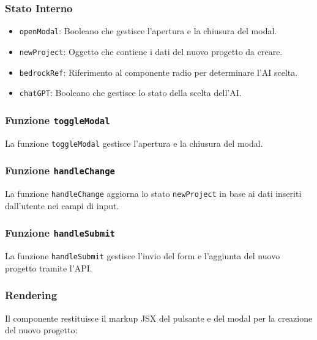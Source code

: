 \documentclass{article}
\begin{document}
\subsubsection*{Stato Interno}
\begin{itemize}
    \item \texttt{openModal}: Booleano che gestisce l'apertura e la chiusura del modal.
    \item \texttt{newProject}: Oggetto che contiene i dati del nuovo progetto da creare.
    \item \texttt{bedrockRef}: Riferimento al componente radio per determinare l'AI scelta.
    \item \texttt{chatGPT}: Booleano che gestisce lo stato della scelta dell'AI.
\end{itemize}

\subsubsection*{Funzione \texttt{toggleModal}}

La funzione \texttt{toggleModal} gestisce l'apertura e la chiusura del modal.

\subsubsection*{Funzione \texttt{handleChange}}

La funzione \texttt{handleChange} aggiorna lo stato \texttt{newProject} in base ai dati inseriti dall'utente nei campi di input.

\subsubsection*{Funzione \texttt{handleSubmit}}

La funzione \texttt{handleSubmit} gestisce l'invio del form e l'aggiunta del nuovo progetto tramite l'API.

\subsubsection*{Rendering}

Il componente restituisce il markup JSX del pulsante e del modal per la creazione del nuovo progetto:
\end{document}
